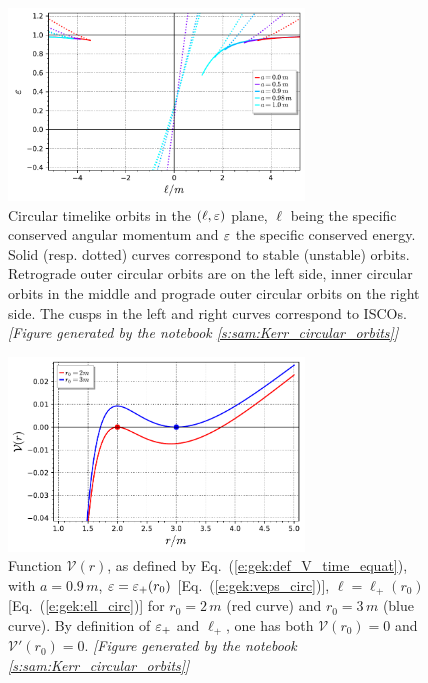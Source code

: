 \begin{figure}
\centerline{\includegraphics[width=0.7\textwidth]{gek_ell_eps_circ_orb.pdf}}
\caption[]{\label{f:gek:ell_eps_circ_orb} \footnotesize
Circular timelike orbits in the $(\ell,\varepsilon)$ plane, $\ell$ being the
specific conserved angular momentum and $\varepsilon$ the specific conserved
energy. Solid (resp. dotted) curves correspond to stable (unstable) orbits.
Retrograde outer circular orbits are on the left side, inner circular orbits
in the middle and prograde outer circular orbits on the right side.
The cusps in the left and right curves correspond to ISCOs.
\textsl{[Figure generated by the notebook \ref{s:sam:Kerr_circular_orbits}]}
}
\end{figure}



\begin{figure}
\centerline{\includegraphics[width=0.7\textwidth]{gek_V_stability.pdf}}
\caption[]{\label{f:gek:V_stability} \footnotesize
Function $\mathcal{V}(r)$, as defined by Eq.~(\ref{e:gek:def_V_time_equat}),
with $a=0.9\, m$, $\varepsilon = \varepsilon_+(r_0)$ [Eq.~(\ref{e:gek:veps_circ})],
$\ell = \ell_+(r_0)$ [Eq.~(\ref{e:gek:ell_circ})] for $r_0 = 2\, m$
(red curve) and $r_0 = 3 \, m$ (blue curve). By definition of $\varepsilon_+$ and $\ell_+$,
one has both $\mathcal{V}(r_0) = 0$ and $\mathcal{V}'(r_0) = 0$.
\textsl{[Figure generated by the notebook \ref{s:sam:Kerr_circular_orbits}]}
}
\end{figure}



